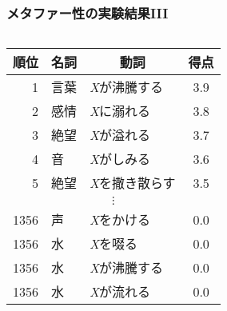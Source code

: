 \documentclass[12pt,usepdftitle=false]{beamer}
\newcommand\header[1]{\multicolumn{1}{c}{\textbf{#1}}}
\begin{document}
\begin{frame}
    \frametitle{メタファー性の実験結果III}
    \begin{columns}
        \begin{column}{0.55\textwidth}
            \begin{table}[t]
                \centering\footnotesize
                \begin{tabular}{rllc}
                    \toprule%
                    \header{順位} & \header{名詞} & \header{動詞} & \header{得点} \\
                    \midrule%
                    1             & 言葉          & \emph{X}が沸騰する   & 3.9           \\
                    2             & 感情          & \emph{X}に溺れる     & 3.8           \\
                    3             & 絶望          & \emph{X}が溢れる     & 3.7           \\
                    4             & 音            & \emph{X}がしみる     & 3.6           \\
                    5             & 絶望          & \emph{X}を撒き散らす & 3.5           \\
                    \multicolumn{4}{c}{$\vdots$} \\[2pt]
                    1356          & 声            & \emph{X}をかける     & 0.0           \\
                    1356          & 水            & \emph{X}を啜る       & 0.0           \\
                    1356          & 水            & \emph{X}が沸騰する   & 0.0           \\
                    1356          & 水            & \emph{X}が流れる     & 0.0           \\

\end{tabular}
\end{table}
\end{column}
\end{columns}
\end{frame}
\end{document}
